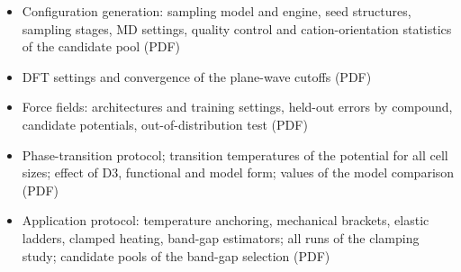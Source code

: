 \begin{itemize}
  \item Configuration generation: sampling model and engine, seed structures, sampling stages, MD
    settings, quality control and cation-orientation statistics of the candidate pool (PDF)
  \item DFT settings and convergence of the plane-wave cutoffs (PDF)
  \item Force fields: architectures and training settings, held-out errors by compound, candidate
    potentials, out-of-distribution test (PDF)
  \item Phase-transition protocol; transition temperatures of the \rSCAN{} potential for all cell sizes;
    effect of D3, functional and model form; values of the model comparison (PDF)
  \item Application protocol: temperature anchoring, mechanical brackets, elastic ladders, clamped
    heating, band-gap estimators; all runs of the clamping study; candidate pools of the band-gap
    selection (PDF)
\end{itemize}
